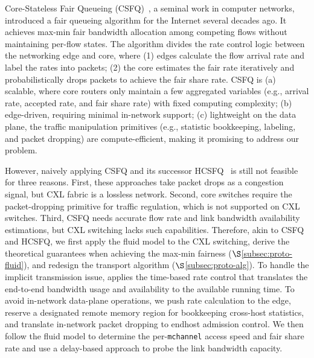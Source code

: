 Core-Stateless Fair Queueing (CSFQ)~\cite{csfq-sigcomm98}, a seminal work in computer networks, introduced a fair queueing algorithm for the Internet several decades ago. 
It achieves max-min fair bandwidth allocation among competing flows without maintaining per-flow states. The algorithm %
divides the rate control logic between the networking edge and core, where 
(1) edges 
calculate the flow arrival rate and label the rates into packets; 
(2) the core 
estimates the fair rate iteratively and probabilistically drops packets to achieve the fair share rate. %
CSFQ is (a) %
scalable, where core routers only maintain a few aggregated variables (e.g., arrival rate, accepted rate, and fair share rate) with fixed computing complexity; (b) edge-driven, requiring minimal in-network support; (c) lightweight on the data plane, the traffic manipulation primitives (e.g., statistic bookkeeping, labeling, and packet dropping) are compute-efficient, making it promising to address our problem.

However, naively applying CSFQ and its successor HCSFQ~\cite{hcsfq-nsdi21} is still not feasible for three reasons. First, these approaches take packet drops as a congestion signal, but CXL fabric is a lossless network. Second, core switches require the packet-dropping primitive for traffic regulation, which is not supported on CXL switches. Third, CSFQ needs accurate flow rate and link bandwidth availability estimations, but CXL switching lacks such capabilities. Therefore, akin to CSFQ and HCSFQ, we first apply the fluid model to the CXL switching, derive the theoretical guarantees when achieving the max-min fairness (\(\S\)\ref{subsec:proto-fluid}), and redesign the transport algorithm (\(\S\)\ref{subsec:proto-alg}). To handle the implicit transmission issue, \sys applies the time-based rate control that translates the end-to-end bandwidth usage and availability to the available running time. To avoid in-network data-plane operations, we push rate calculation to the edge, reserve a designated remote memory region for bookkeeping cross-host statistics, and translate in-network packet dropping to endhost admission control. We then follow the fluid model to determine the per-\texttt{mchannel} access speed and fair share rate and use a delay-based approach to probe the link bandwidth capacity.



